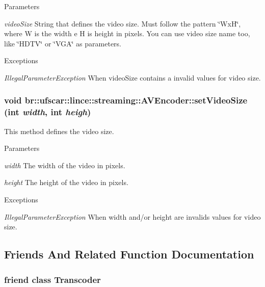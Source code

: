 \begin{DoxyParams}{Parameters}
\item[{\em videoSize}]String that defines the video size. Must follow the pattern \char`\"{}WxH\char`\"{}, where W is the width e H is height in pixels. You can use video size name too, like \char`\"{}HDTV\char`\"{} or \char`\"{}VGA\char`\"{} as parameters. \end{DoxyParams}

\begin{DoxyExceptions}{Exceptions}
\item[{\em IllegalParameterException}]When videoSize contains a invalid values for video size. \end{DoxyExceptions}
\hypertarget{classbr_1_1ufscar_1_1lince_1_1streaming_1_1AVEncoder_a04f88134e8d7d941f8250685f194c7f1}{
\subsubsection[{setVideoSize}]{\setlength{\rightskip}{0pt plus 5cm}void br::ufscar::lince::streaming::AVEncoder::setVideoSize (int {\em width}, \/  int {\em heigh})}}
\label{classbr_1_1ufscar_1_1lince_1_1streaming_1_1AVEncoder_a04f88134e8d7d941f8250685f194c7f1}


This method defines the video size. 


\begin{DoxyParams}{Parameters}
\item[{\em width}]The width of the video in pixels. \item[{\em height}]The height of the video in pixels. \end{DoxyParams}

\begin{DoxyExceptions}{Exceptions}
\item[{\em IllegalParameterException}]When width and/or height are invalids values for video size. \end{DoxyExceptions}


\subsection{Friends And Related Function Documentation}
\hypertarget{classbr_1_1ufscar_1_1lince_1_1streaming_1_1AVEncoder_af9f366fbe5cbc06f38791f120c62c182}{
\subsubsection[{Transcoder}]{\setlength{\rightskip}{0pt plus 5cm}friend class {\bf Transcoder}}}
\label{classbr_1_1ufscar_1_1lince_1_1streaming_1_1AVEncoder_af9f366fbe5cbc06f38791f120c62c182}



